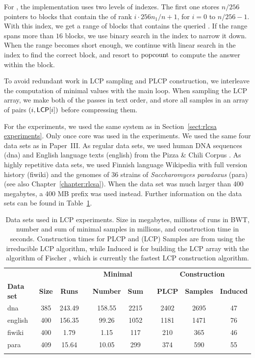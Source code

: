 For \select, the implementation uses two levels of indexes. The first one stores $n/256$ pointers to blocks that contain the \onebit{} of rank $i \cdot 256n_{1}/n + 1$, for $i = 0$ to $n/256 - 1$. With this index, we get a range of blocks that contains the queried \onebit. If the range spans more than $16$ blocks, we use binary search in the \rank{} index to narrow it down. When the range becomes short enough, we continue with linear search in the \rank{} index to find the correct block, and resort to $\operatorname{popcount}$ to compute the answer within the block.

To avoid redundant work in LCP sampling and PLCP construction, we interleave the computation of minimal values with the main loop. When sampling the LCP array, we make both of the passes in text order, and store all samples in an array of pairs $(i, \mathsf{LCP}[i])$ before compressing them.

For the experiments, we used the same system as in Section~\ref{sect:rlcsa experiments}. Only once core was used in the experiments. We used the same four data sets as in Paper~III. As regular data sets, we used human DNA sequences (dna) and English language texts (english) from the Pizza \& Chili Corpus \cite{Ferragina2009a}. As highly repetitive data sets, we used Finnish language Wikipedia with full version history (fiwiki) and the genomes of 36 strains of \emph{Saccharomyces paradoxus} (para) (see also Chapter~\ref{chapter:rlcsa}). When the data set was much larger than 400 megabytes, a 400 MB prefix was used instead. Further information on the data sets can be found in Table~\ref{table:lcp data sets}.

\begin{table}
\centering
\renewcommand{\tabcolsep}{.1cm}
\begin{tabular}{lccccccccc}
\hline\noalign{\smallskip}
 & & & & \multicolumn{2}{c}{\textbf{Minimal}} & & \multicolumn{3}{c}{\textbf{Construction}} \\
\textbf{Data set} & \textbf{Size} & \textbf{Runs} & & \textbf{Number} & \textbf{Sum} & & \textbf{PLCP} & \textbf{Samples} & \textbf{Induced} \\
\noalign{\smallskip}
\hline
\noalign{\smallskip}
dna     & 385 & 243.49 & & 158.55 & 2215 & & 2402 & 2695 & 47 \\
english & 400 & 156.35 & &  99.26 & 1052 & & 1181 & 1471 & 76 \\
fiwiki  & 400 &   1.79 & &   1.15 &  117 & &  210 &  365 & 46 \\
para    & 409 &  15.64 & &  10.05 &  299 & &  374 &  590 & 55 \\
\noalign{\smallskip}
\hline
\end{tabular}

\caption{Data sets used in LCP experiments. Size in megabytes, millions of runs in BWT, number and sum of minimal samples in millions, and construction time in seconds. Construction times for PLCP and (LCP) Samples are from using the irreducible LCP algorithm, while Induced is for building the LCP array with the algorithm of Fischer \cite{Fischer2011}, which is currently the fastest LCP construction algorithm.}\label{table:lcp data sets}
\end{table}

